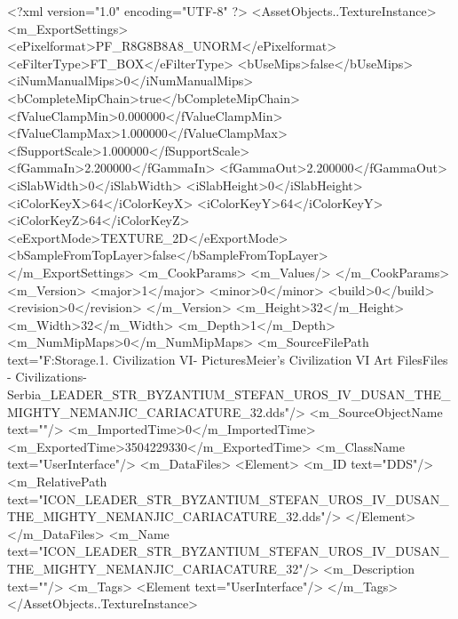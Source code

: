 <?xml version="1.0" encoding="UTF-8" ?>
<AssetObjects..TextureInstance>
	<m_ExportSettings>
		<ePixelformat>PF_R8G8B8A8_UNORM</ePixelformat>
		<eFilterType>FT_BOX</eFilterType>
		<bUseMips>false</bUseMips>
		<iNumManualMips>0</iNumManualMips>
		<bCompleteMipChain>true</bCompleteMipChain>
		<fValueClampMin>0.000000</fValueClampMin>
		<fValueClampMax>1.000000</fValueClampMax>
		<fSupportScale>1.000000</fSupportScale>
		<fGammaIn>2.200000</fGammaIn>
		<fGammaOut>2.200000</fGammaOut>
		<iSlabWidth>0</iSlabWidth>
		<iSlabHeight>0</iSlabHeight>
		<iColorKeyX>64</iColorKeyX>
		<iColorKeyY>64</iColorKeyY>
		<iColorKeyZ>64</iColorKeyZ>
		<eExportMode>TEXTURE_2D</eExportMode>
		<bSampleFromTopLayer>false</bSampleFromTopLayer>
	</m_ExportSettings>
	<m_CookParams>
		<m_Values/>
	</m_CookParams>
	<m_Version>
		<major>1</major>
		<minor>0</minor>
		<build>0</build>
		<revision>0</revision>
	</m_Version>
	<m_Height>32</m_Height>
	<m_Width>32</m_Width>
	<m_Depth>1</m_Depth>
	<m_NumMipMaps>0</m_NumMipMaps>
	<m_SourceFilePath text="F:\Mod Storage\2.1. Civilization VI\Mods\Archive - Pictures\Sid Meier's Civilization VI Art Files\Art Files - Civilizations\Civilization - Serbia\ICON_LEADER_STR_BYZANTIUM_STEFAN_UROS_IV_DUSAN_THE_MIGHTY_NEMANJIC_CARIACATURE_32.dds"/>
	<m_SourceObjectName text=""/>
	<m_ImportedTime>0</m_ImportedTime>
	<m_ExportedTime>3504229330</m_ExportedTime>
	<m_ClassName text="UserInterface"/>
	<m_DataFiles>
		<Element>
			<m_ID text="DDS"/>
			<m_RelativePath text="ICON_LEADER_STR_BYZANTIUM_STEFAN_UROS_IV_DUSAN_THE_MIGHTY_NEMANJIC_CARIACATURE_32.dds"/>
		</Element>
	</m_DataFiles>
	<m_Name text="ICON_LEADER_STR_BYZANTIUM_STEFAN_UROS_IV_DUSAN_THE_MIGHTY_NEMANJIC_CARIACATURE_32"/>
	<m_Description text=""/>
	<m_Tags>
		<Element text="UserInterface"/>
	</m_Tags>
</AssetObjects..TextureInstance>

